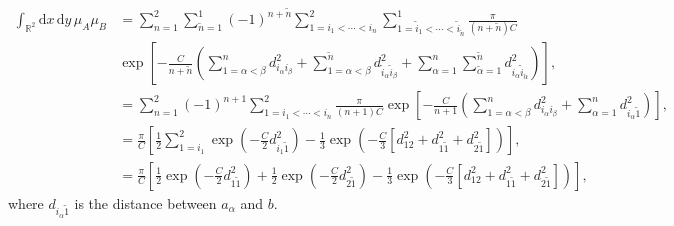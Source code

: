\documentclass[12pt]{article}
\newcommand{\xd}{\mathrm{d}}
\numberwithin{equation}{section} %
\numberwithin{figure}{section} %
\theoremstyle{definition}
\begin{document}
\begin{align}
\int_{{\mathbb R}^2} \xd x \, \xd y \, \mu_A \mu_B &=  \sum_{n=1}^{2} \sum_{\tilde{n}=1}^{1} (-1)^{n+\tilde{n}} \sum_{ 1=i_1< \cdots <i_n }^{2} \sum_{ 1=\tilde{i}_1< \cdots <\tilde{i}_{\tilde{n}} }^{1} \frac{\pi}{(n+\tilde{n})C}
 \nonumber\\
& \exp \left[ - \frac{C}{n+\tilde{n}} \left( \sum_{1=\alpha < \beta}^n d_{i_{\alpha} i_{\beta}}^2 + \sum_{1=\alpha < \beta}^{\tilde{n}} d_{\tilde{i}_{\alpha} \tilde{i}_{\beta}}^2 +
\sum_{\alpha=1}^n \sum_{\tilde{\alpha}=1}^{\tilde{n}}  d_{i_{\alpha} \tilde{i}_{\tilde{\alpha}}}^2 \right) \right], \\
&=  \sum_{n=1}^{2}  (-1)^{n+1} \sum_{ 1=i_1< \cdots <i_n }^{2}  \frac{\pi}{(n+1)C}
 \exp \left[ - \frac{C}{n+1} \left( \sum_{1=\alpha < \beta}^n d_{i_{\alpha} i_{\beta}}^2 +
\sum_{\alpha=1}^n  d_{i_{\alpha} {\tilde{1}}}^2 \right) \right], \\
&= \frac{\pi}{C} \left[  \frac12 \sum_{ 1=i_1 }^{2} \exp \left( - \frac{C}{2} d_{i_1 \tilde{1}}^2 \right)  - \frac{1}{3} \exp \left( -\frac{C}{3} [d_{12}^2 + d_{1 \tilde{1}}^2 + d_{2 \tilde{1}}^2 ]\right)  \right], \\
&= \frac{\pi}{C} \left[  \frac12  \exp \left( - \frac{C}{2} d_{1 \tilde{1}}^2 \right) + \frac12  \exp \left( - \frac{C}{2} d_{2 \tilde{1}}^2 \right)  - \frac{1}{3} \exp \left( -\frac{C}{3} [d_{12}^2 + d_{1 \tilde{1}}^2 + d_{2 \tilde{1}}^2 ]\right)  \right],  
\end{align}
where $d_{i_{\alpha} \tilde{1}}$ is the distance between $a_{\alpha}$ and $b$.
\end{document}
